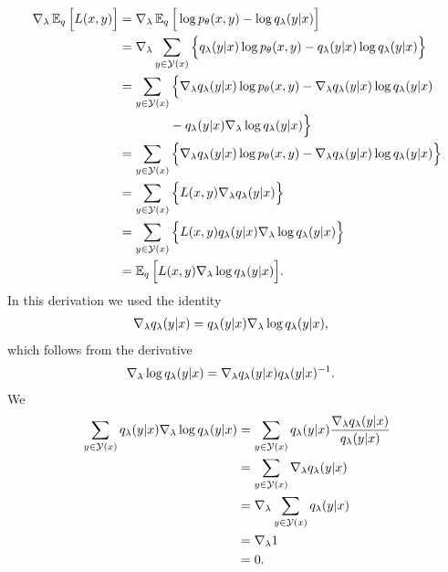 \begin{align*}
  \nabla_{\lambda} \operatorname{\mathbb{E}}_{q} \Big[ L(x, y) \Big] &=
  \nabla_{\lambda} \operatorname{\mathbb{E}}_{q} \Big[ \log p_{\theta}(x, y) - \log q_{\lambda}(y | x) \Big] \\
    &= \nabla_{\lambda} \sum_{y \in \mathcal{Y}(x)} \Big\{ q_{\lambda}(y | x) \log p_{\theta}(x, y) - q_{\lambda}(y | x)\log q_{\lambda}(y | x) \Big\} \\
    &= \sum_{y \in \mathcal{Y}(x)} \Big\{ \nabla_{\lambda} q_{\lambda}(y | x) \log p_{\theta}(x, y)  - \nabla_{\lambda} q_{\lambda}(y | x)\log q_{\lambda}(y | x) \\
    &\qquad\qquad -  q_{\lambda}(y | x)\nabla_{\lambda}\log q_{\lambda}(y | x) \Big\} \\
    &= \sum_{y \in \mathcal{Y}(x)} \Big\{ \nabla_{\lambda} q_{\lambda}(y | x) \log p_{\theta}(x, y) - \nabla_{\lambda} q_{\lambda}(y | x)\log q_{\lambda}(y | x) \Big\} \\
    &= \sum_{y \in \mathcal{Y}(x)} \Big\{ L(x, y)\nabla_{\lambda} q_{\lambda}(y | x) \Big\} \\
    &= \sum_{y \in \mathcal{Y}(x)} \Big\{ L(x, y) q_{\lambda}(y | x) \nabla_{\lambda} \log q_{\lambda}(y | x) \Big\}   \\
    &= \operatorname{\mathbb{E}}_{q} \Big[ L(x, y) \nabla_{\lambda} \log q_{\lambda}(y | x) \Big].
\end{align*}
In this derivation we used the identity
\begin{align*}
    \nabla_{\lambda} q_{\lambda}(y | x) &= q_{\lambda}(y | x)\nabla_{\lambda}\log q_{\lambda}(y | x),
\end{align*}
which follows from the derivative
\begin{align*}
    \nabla_{\lambda}\log q_{\lambda}(y | x) &= \nabla_{\lambda} q_{\lambda}(y | x)q_{\lambda}(y | x)^{-1}.
\end{align*}
We
\begin{align*}
    \sum_{y \in \mathcal{Y}(x)} q_{\lambda}(y | x)\nabla_{\lambda}\log q_{\lambda}(y | x)
        &= \sum_{y \in \mathcal{Y}(x)}  q_{\lambda}(y | x) \frac{\nabla_{\lambda} q_{\lambda}(y | x)}{q_{\lambda}(y | x)}  \\
        &= \sum_{y \in \mathcal{Y}(x)} \nabla_{\lambda} q_{\lambda}(y | x) \\
        &= \nabla_{\lambda} \sum_{y \in \mathcal{Y}(x)} q_{\lambda}(y | x)\\
        &= \nabla_{\lambda} 1 \\
        &= 0. \\
\end{align*}


